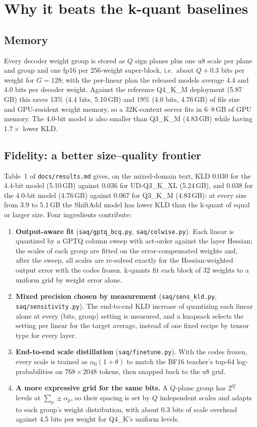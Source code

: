 \documentclass[11pt]{article}
\begin{document}
\section{Why it beats the k-quant baselines}

\subsection{Memory}
Every decoder weight group is stored as $Q$ sign planes plus one u8 scale per plane and group and one fp16 per
256-weight super-block, i.e.\ about $Q + 0.3$ bits per weight for $G = 128$; with the per-linear plan the released
models average 4.4 and 4.0 bits per decoder weight. Against the reference Q4\_K\_M deployment (5.87\,GB) this saves
13\% (4.4 bits, 5.10\,GB) and 19\% (4.0 bits, 4.76\,GB) of file size and GPU-resident weight memory, so a 32K-context
server fits in 6--8\,GB of GPU memory. The 4.0-bit model is also smaller than Q3\_K\_M (4.83\,GB) while having
$1.7\times$ lower KLD.

\subsection{Fidelity: a better size--quality frontier}
Table~1 of \texttt{docs/results.md} gives, on the mixed-domain text, KLD $0.030$ for the 4.4-bit model (5.10\,GB)
against $0.036$ for UD-Q3\_K\_XL (5.24\,GB), and $0.038$ for the 4.0-bit model (4.76\,GB) against $0.067$ for
Q3\_K\_M (4.83\,GB): at every size from 3.9 to 5.1\,GB the ShiftAdd model has lower KLD than the k-quant of equal or
larger size. Four ingredients contribute:
\begin{enumerate}
\item \textbf{Output-aware fit} (\texttt{saq/gptq\_bcq.py}, \texttt{saq/colwise.py}). Each linear is quantized by a
  GPTQ column sweep with act-order against the layer Hessian; the scales of each group are fitted on the
  error-compensated weights and, after the sweep, all scales are re-solved exactly for the Hessian-weighted output
  error with the codes frozen. k-quants fit each block of 32 weights to a uniform grid by weight error alone.
\item \textbf{Mixed precision chosen by measurement} (\texttt{saq/sens\_kld.py}, \texttt{saq/sensitivity.py}). The
  end-to-end KLD increase of quantizing each linear alone at every (bits, group) setting is measured, and a knapsack
  selects the setting per linear for the target average, instead of one fixed recipe by tensor type for every layer.
\item \textbf{End-to-end scale distillation} (\texttt{saq/finetune.py}). With the codes frozen, every scale is trained as
  $\alpha_0(1+\theta)$ to match the BF16 teacher's top-64 log-probabilities on $768 \times 2048$ tokens, then snapped
  back to the u8 grid.
\item \textbf{A more expressive grid for the same bits.} A $Q$-plane group has $2^Q$ levels at $\sum_p \pm \alpha_p$,
  so their spacing is set by $Q$ independent scales and adapts to each group's weight distribution, with about 0.3 bits
  of scale overhead against 4.5 bits per weight for Q4\_K's uniform levels.
\end{enumerate}
\end{document}
